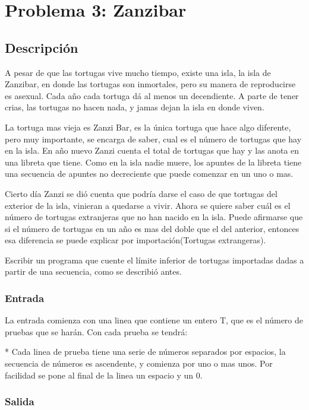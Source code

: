 \section{Problema 3: Zanzibar}

\subsection{Descripción}

A pesar de que las tortugas vive mucho tiempo, existe una isla, la isla de Zanzibar, en donde las tortugas son inmortales, pero su manera de reproducirse es asexual. Cada año cada tortuga dá al menos un decendiente. A parte de tener crias, las tortugas no hacen nada, y jamas dejan la isla en donde viven.

La tortuga mas vieja es Zanzi Bar, es la única tortuga que hace algo diferente, pero muy importante, se encarga de saber, cual es el número de tortugas que hay en la isla. En año nuevo Zanzi cuenta el total de tortugas que hay y las anota en una libreta que tiene. Como en la isla nadie muere, los apuntes de la libreta tiene una secuencia de apuntes no decreciente que puede comenzar en un uno o mas.

Cierto día Zanzi se dió cuenta que podría darse el caso de que tortugas del exterior de la isla, vinieran a quedarse a vivir. Ahora se quiere saber cuál es el número de tortugas extranjeras que no han nacido en la isla. Puede afirmarse que si el número de tortugas en un año es mas del doble que el del anterior, entonces esa diferencia se puede explicar por importación(Tortugas extrangeras).

Escribir un programa que cuente el límite inferior de tortugas importadas dadas a partir de una secuencia, como se describió antes.

\subsubsection{Entrada}

La entrada comienza con una linea que contiene un entero T, que es el número de pruebas que se harán. Con cada prueba se tendrá:

* Cada linea de prueba tiene una serie de números  separados por espacios, la secuencia de números es ascendente, y comienza por uno o mas unos. Por facilidad se pone al final de la linea un espacio y un 0.

\subsubsection{Salida}

